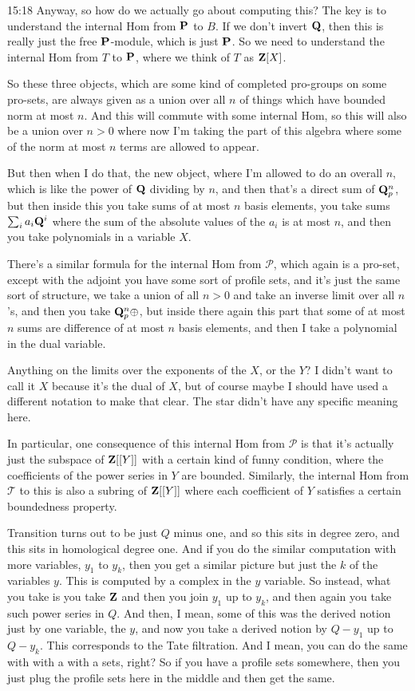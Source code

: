 \begin{unfinished}{15:18}
Anyway, so how do we actually go about computing this? The key is to understand the internal Hom from $\P$ to $B$. If we don't invert $\Q$, then this is really just the free $\P$-module, which is just $\P$. So we need to understand the internal Hom from $T$ to $\P$, where we think of $T$ as $\Z[X]$.

So these three objects, which are some kind of completed pro-groups on some pro-sets, are always given as a union over all $n$ of things which have bounded norm at most $n$. And this will commute with some internal Hom, so this will also be a union over $n > 0$ where now I'm taking the part of this algebra where some of the norm at most $n$ terms are allowed to appear. 

But then when I do that, the new object, where I'm allowed to do an overall $n$, which is like the power of $\Q$ dividing by $n$, and then that's a direct sum of $\Q_p^n$, but then inside this you take sums of at most $n$ basis elements, you take sums $\sum_{i} a_i \Q^i$ where the sum of the absolute values of the $a_i$ is at most $n$, and then you take polynomials in a variable $X$.

There's a similar formula for the internal Hom from $\mathcal{P}$, which again is a pro-set, except with the adjoint you have some sort of profile sets, and it's just the same sort of structure, we take a union of all $n > 0$ and take an inverse limit over all $n$'s, and then you take $\Q_p^n \oplus$, but inside there again this part that some of at most $n$ sums are difference of at most $n$ basis elements, and then I take a polynomial in the dual variable.

Anything on the limits over the exponents of the $X$, or the $Y$? I didn't want to call it $X$ because it's the dual of $X$, but of course maybe I should have used a different notation to make that clear. The star didn't have any specific meaning here.

In particular, one consequence of this internal Hom from $\mathcal{P}$ is that it's actually just the subspace of $\Z[[Y]]$ with a certain kind of funny condition, where the coefficients of the power series in $Y$ are bounded. Similarly, the internal Hom from $\mathcal{T}$ to this is also a subring of $\Z[[Y]]$ where each coefficient of $Y$ satisfies a certain boundedness property.

Transition turns out to be just $Q$ minus one, and so this sits in degree zero, and this sits in homological degree one. And if you do the similar computation with more variables, $y_1$ to $y_k$, then you get a similar picture but just the $k$ of the variables $y$. This is computed by a complex in the $y$ variable. So instead, what you take is you take $\Z$ and then you join $y_1$ up to $y_k$, and then again you take such power series in $Q$. And then, I mean, some of this was the derived notion just by one variable, the $y$, and now you take a derived notion by $Q - y_1$ up to $Q - y_k$. This corresponds to the Tate filtration. And I mean, you can do the same with with a with a sets, right? So if you have a profile sets somewhere, then you just plug the profile sets here in the middle and then get the same.


\end{unfinished}
